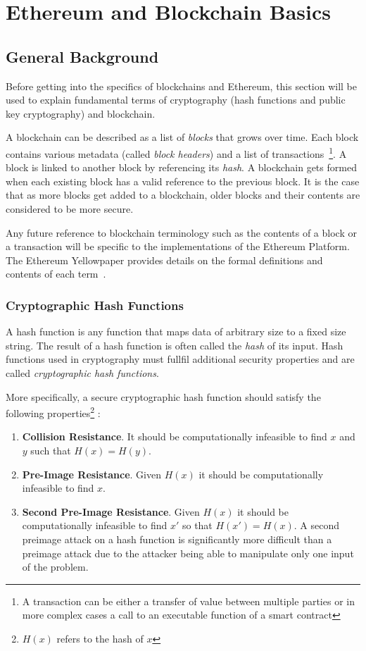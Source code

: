 \chapter{Ethereum and Blockchain Basics}\label{ch:basics}

\section{General Background}
Before getting into the specifics of blockchains and Ethereum, this section will be used to explain fundamental terms of cryptography (hash functions and public key cryptography) and blockchain.

A blockchain can be described as a list of \textit{blocks} that grows over time. Each block contains various metadata (called \textit{block headers}) and a list of transactions~\footnote{A transaction can be either a transfer of value between multiple parties or in more complex cases a call to an executable function of a smart contract}. A block is linked to another block by referencing its \textit{hash}. A blockchain gets formed when each existing block has a valid reference to the previous block. It is the case that as more blocks get added to a blockchain, older blocks and their contents are considered to be more secure.

Any future reference to blockchain terminology such as the contents of a block or a transaction will be specific to the implementations of the Ethereum Platform. The Ethereum Yellowpaper provides details on the formal definitions and contents of each term~\cite{ethereum}.

\subsection{Cryptographic Hash Functions}
A hash function is any function that maps data of arbitrary size to a fixed size string. The result of a hash function is often called the \textit{hash} of its input. Hash functions used in cryptography must fullfil additional security properties and are called \textit{cryptographic hash functions}.

More specifically, a secure cryptographic hash function should satisfy the following properties\footnote{\(H(x)\) refers to the hash of $x$} \cite{Rogaway04cryptographichash-function}:
\begin{enumerate}
   \item \textbf{Collision Resistance}. It should be computationally infeasible to find $x$ and $y$ such that \(H(x) = H(y)\). 
   \item \textbf{Pre-Image Resistance}. Given \(H(x)\) it should be computationally infeasible to find \(x\).
   \item \textbf{Second Pre-Image Resistance}. Given \(H(x)\) it should be computationally infeasible to find \(x'\) so that \(H(x') = H(x)\). A second preimage attack on a hash function is significantly more difficult than a preimage attack due to the attacker being able to manipulate only one input of the problem. 
\end{enumerate}

